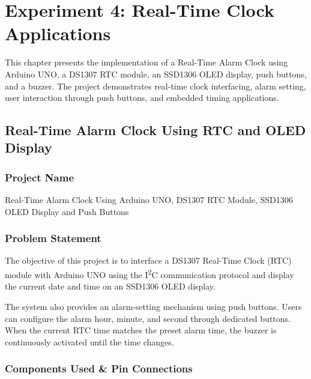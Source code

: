 
\chapter{Experiment 4: Real-Time Clock Applications}

This chapter presents the implementation of a Real-Time Alarm Clock using Arduino UNO, a DS1307 RTC module, an SSD1306 OLED display, push buttons, and a buzzer. The project demonstrates real-time clock interfacing, alarm setting, user interaction through push buttons, and embedded timing applications.


\section{Real-Time Alarm Clock Using RTC and OLED Display}


\subsection{Project Name}

Real-Time Alarm Clock Using Arduino UNO, DS1307 RTC Module, SSD1306 OLED Display and Push Buttons


\subsection{Problem Statement}

The objective of this project is to interface a DS1307 Real-Time Clock (RTC) module with Arduino UNO using the I\textsuperscript{2}C communication protocol and display the current date and time on an SSD1306 OLED display.

The system also provides an alarm-setting mechanism using push buttons. Users can configure the alarm hour, minute, and second through dedicated buttons. When the current RTC time matches the preset alarm time, the buzzer is continuously activated until the time changes.


\subsection{Components Used \& Pin Connections}

